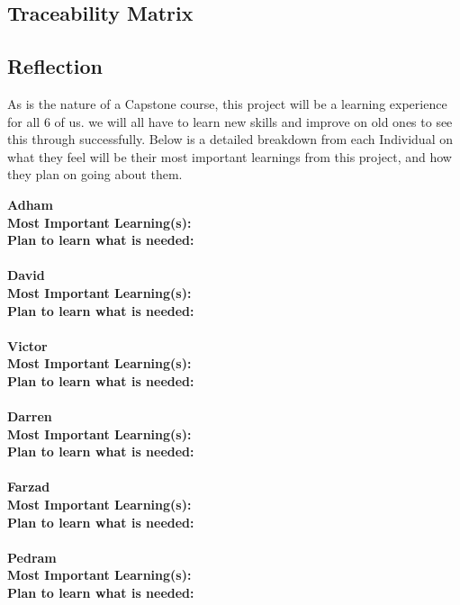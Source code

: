 \documentclass[12pt]{article}
\begin{document}
\subsection{Traceability Matrix}

\subsection{Reflection}

As is the nature of a Capstone course, this project will be a learning experience for all 6 of us. we will all have to learn new skills and improve on old ones to see this 
through successfully. Below is a detailed breakdown from each Individual on what they feel will be their most important learnings from this project, and how they plan on
going about them.

\noindent\textbf{Adham}\\
\textbf{Most Important Learning(s):}\\
\textbf{Plan to learn what is needed:}\\\\

\noindent\textbf{David}\\
\textbf{Most Important Learning(s):}\\
\textbf{Plan to learn what is needed:}\\\\

\noindent\textbf{Victor}\\
\textbf{Most Important Learning(s):}\\
\textbf{Plan to learn what is needed:}\\\\

\noindent\textbf{Darren}\\
\textbf{Most Important Learning(s):}\\
\textbf{Plan to learn what is needed:}\\\\

\noindent\textbf{Farzad}\\
\textbf{Most Important Learning(s):}\\
\textbf{Plan to learn what is needed:}\\\\

\noindent\textbf{Pedram}\\
\textbf{Most Important Learning(s):}\\
\textbf{Plan to learn what is needed:}\\\\
\end{document}
